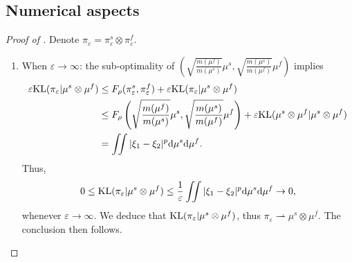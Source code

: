 \subsection{Numerical aspects}
\begin{proof}[Proof of ]
  Denote $\pi_{\varepsilon} = \pi_{\varepsilon}^s \otimes \pi_{\varepsilon}^f$.
  \begin{enumerate}
    \item When $\varepsilon \to \infty$: the sub-optimality of
    $\left( \sqrt{\frac{m(\mu^f)}{m(\mu^s)}} \mu^s, \sqrt{\frac{m(\mu^s)}{m(\mu^f)}} \mu^f \right)$
    implies
    \begin{equation}
      \begin{split}
        \varepsilon \text{KL}(\pi_{\varepsilon} \vert \mu^s \otimes \mu^f)
        &\leq F_{\rho}(\pi_{\varepsilon}^s, \pi_{\varepsilon}^f) +
        \varepsilon \text{KL}(\pi_{\varepsilon} \vert \mu^s \otimes \mu^f) \\
        &\leq F_{\rho} \left( \sqrt{\frac{m(\mu^f)}{m(\mu^s)}} \mu^s, \sqrt{\frac{m(\mu^s)}{m(\mu^f)}} \mu^f \right) +
        \varepsilon \text{KL}( \mu^s \otimes \mu^f \vert \mu^s \otimes \mu^f) \\
        &= \iint \vert \xi_1 - \xi_2 \vert^p \mathrm d\mu^s \mathrm d\mu^f.
      \end{split}
    \end{equation}
    Thus,
    \begin{equation}
      0 \leq \text{KL}(\pi_{\varepsilon} \vert \mu^s \otimes \mu^f)
      \leq \frac{1}{\varepsilon} \iint \vert \xi_1 - \xi_2 \vert^p
      \mathrm d\mu^s \mathrm d\mu^f \to 0,
    \end{equation}
    whenever $\varepsilon \to \infty$. We deduce that
    $\text{KL}(\pi_{\varepsilon} \vert \mu^s \otimes \mu^f)$,
    thus $\pi_{\varepsilon} \rightharpoonup \mu^s \otimes \mu^f$. The conclusion then follows.


\end{enumerate}
\end{proof}
